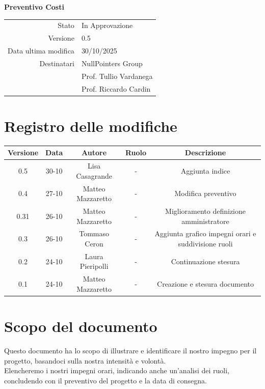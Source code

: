 \documentclass{article}
\begin{document}
	\vspace{2cm}
	
	{
		\centering
		\Huge\bfseries Preventivo Costi\par
		\vspace{0.5cm}
	}
	
	\begin{center}
		\begin{tabular}{r|l}
			Stato & In Approvazione \\
			Versione & 0.5 \\
			Data ultima modifica & 30/10/2025 \\
			Destinatari & NullPointers Group \\
			& Prof. Tullio Vardanega \\
			& Prof. Riccardo Cardin \\
		\end{tabular}
	\end{center}
	
	\newpage
	\tableofcontents
          \newpage
	\section{Registro delle modifiche}
	
	\begin{table}[htbp]
		\begin{tabular}{|c|c|c|c|c|}
			\hline
			\rowcolor[gray]{0.9}
			Versione & Data & Autore & Ruolo & Descrizione \\
			\hline
			0.5 & 30-10 & Lisa Casagrande & - & Aggiunta indice \\ 
			\hline
			0.4 & 27-10 & Matteo Mazzaretto & - & Modifica preventivo \\ 
			\hline
			0.31 & 26-10 & Matteo Mazzaretto & - & Miglioramento definizione amministratore \\ 
			\hline
			0.3 & 26-10 & Tommaso Ceron & - & Aggiunta grafico impegni orari e suddivisione ruoli \\ 
			\hline
			0.2 & 24-10 & Laura Pieripolli & - & Continuazione stesura \\ 
			\hline
			0.1 & 24-10 & Matteo Mazzaretto & - & Creazione e stesura documento \\ 
			\hline
		\end{tabular}
	\end{table}
	
	\newpage
	
	\section{Scopo del documento}
	Questo documento ha lo scopo di illustrare e identificare il nostro impegno per il progetto, basandoci sulla nostra intensità e volontà.\\
	Elencheremo i nostri impegni orari, indicando anche un'analisi dei ruoli, concludendo con il preventivo del progetto e la data di consegna.
	
\end{document}
